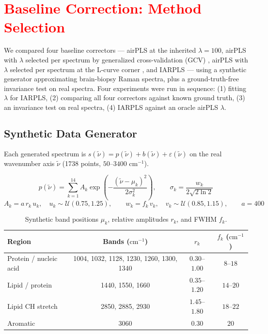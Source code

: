 \appendix

\section{\textcolor{red}{Baseline Correction: Method Selection}}
\label{app:baseline_correction}
\setcounter{table}{0}
\renewcommand{\thetable}{\Alph{section}.\arabic{table}}

We compared four baseline correctors — airPLS \cite{Zhang2010} at the inherited $\lambda=100$, airPLS with $\lambda$ selected per spectrum by generalized cross-validation (GCV) \cite{craven1978smoothing}, airPLS with $\lambda$ selected per spectrum at the L-curve corner \cite{hansen1992analysis}, and IARPLS \cite{ye2020baseline} — using a synthetic generator approximating brain-biopsy Raman spectra, plus a ground-truth-free invariance test on real spectra. Four experiments were run in sequence: (1) fitting $\lambda$ for IARPLS, (2) comparing all four correctors against known ground truth, (3) an invariance test on real spectra, (4) IARPLS against an oracle airPLS $\lambda$.

\subsection*{Synthetic Data Generator}
Each generated spectrum is $s(\tilde\nu) = p(\tilde\nu) + b(\tilde\nu) + \varepsilon(\tilde\nu)$ on the real wavenumber axis $\tilde\nu$ (1738 points, $50$--$3400\text{ cm}^{-1}$).

\[
p(\tilde\nu) = \sum_{k=1}^{14} A_k \exp\!\left(-\frac{(\tilde\nu-\mu_k)^2}{2\sigma_k^2}\right), \qquad \sigma_k=\frac{w_k}{2\sqrt{2\ln 2}}
\]
\[
A_k = a\,r_k\,u_k,\quad u_k\sim\mathcal U(0.75,1.25), \qquad w_k = f_k\,v_k,\quad v_k\sim\mathcal U(0.85,1.15), \qquad a=400
\]

\begin{table}[H]
\centering
\small
\caption{Synthetic band positions $\mu_k$, relative amplitudes $r_k$, and FWHM $f_k$.}
\label{tab:baseline_generator_bands}
\begin{tabular*}{\textwidth}{@{\extracolsep{\fill}}lccc}
\toprule
Region & Bands ($\text{cm}^{-1}$) & $r_k$ & $f_k$ ($\text{cm}^{-1}$) \\
\midrule
Protein / nucleic acid & 1004, 1032, 1128, 1230, 1260, 1300, 1340 & $0.30$--$1.00$ & $8$--$18$ \\
Lipid / protein & 1440, 1550, 1660 & $0.35$--$1.20$ & $14$--$20$ \\
Lipid CH stretch & 2850, 2885, 2930 & $1.45$--$1.80$ & $18$--$22$ \\
Aromatic & 3060 & $0.30$ & $20$ \\
\bottomrule
\end{tabular*}
\end{table}

